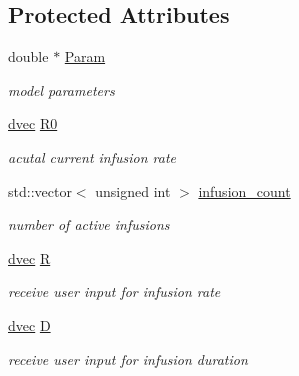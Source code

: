 \subsection*{Protected Attributes}
\begin{DoxyCompactItemize}
\item 
\mbox{\label{classodeproblem_a8d6506f6a9e0676911ee86659db725ae}} 
double $\ast$ \hyperlink{classodeproblem_a8d6506f6a9e0676911ee86659db725ae}{Param}
\begin{DoxyCompactList}\small\item\em model parameters \end{DoxyCompactList}\item 
\mbox{\label{classodeproblem_ae467cabc47b5d75c07cb2d48915d4507}} 
\hyperlink{mrgsolv_8h_ac6aa1a2351760492203846ae74778c05}{dvec} \hyperlink{classodeproblem_ae467cabc47b5d75c07cb2d48915d4507}{R0}
\begin{DoxyCompactList}\small\item\em acutal current infusion rate \end{DoxyCompactList}\item 
\mbox{\label{classodeproblem_a51662bd0cd437b3481f83b662172d505}} 
std\+::vector$<$ unsigned int $>$ \hyperlink{classodeproblem_a51662bd0cd437b3481f83b662172d505}{infusion\+\_\+count}
\begin{DoxyCompactList}\small\item\em number of active infusions \end{DoxyCompactList}\item 
\mbox{\label{classodeproblem_af0b19177db1bdd5a610b34c298b8a7e5}} 
\hyperlink{mrgsolv_8h_ac6aa1a2351760492203846ae74778c05}{dvec} \hyperlink{classodeproblem_af0b19177db1bdd5a610b34c298b8a7e5}{R}
\begin{DoxyCompactList}\small\item\em receive user input for infusion rate \end{DoxyCompactList}\item 
\mbox{\label{classodeproblem_af46382c0b9a5a489f726d0fb360d9e40}} 
\hyperlink{mrgsolv_8h_ac6aa1a2351760492203846ae74778c05}{dvec} \hyperlink{classodeproblem_af46382c0b9a5a489f726d0fb360d9e40}{D}
\begin{DoxyCompactList}\small\item\em receive user input for infusion duration \end{DoxyCompactList}\item 

\end{DoxyCompactItemize}
